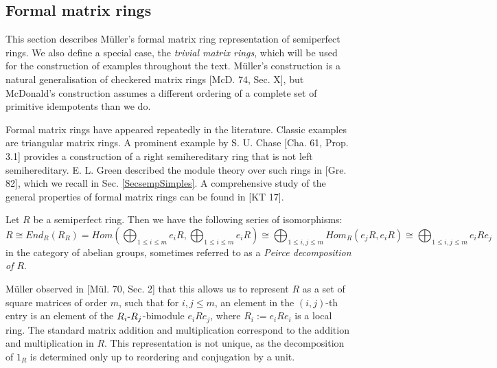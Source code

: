\documentclass[11pt]{article}
\theoremstyle{plain}
\theoremstyle{remark}
\theoremstyle{plain}
\begin{document}
\subsection{Formal matrix rings}\label{Secsempmatrix}


This section describes Müller's formal matrix ring representation of semiperfect rings. We also define a special case, the \textit{trivial matrix rings}, which will be used for the construction of examples throughout the text. Müller's construction is a natural generalisation of checkered matrix rings [McD. 74, Sec. X], but McDonald's construction assumes a different ordering of a complete set of primitive idempotents than we do.

Formal matrix rings have appeared repeatedly in the literature. Classic examples are triangular matrix rings. A prominent example by S. U. Chase [Cha. 61, Prop. 3.1] provides a construction of a right semihereditary ring that is not left semihereditary. E. L. Green described the module theory over such rings in [Gre. 82], which we recall in Sec. \ref{SecsempSimples}.  A comprehensive study of the general properties of formal matrix rings can be found in [KT 17].


\smallskip

Let $R$ be a semiperfect ring. Then we have the following series of isomorphisms:
\[R\cong End_R(R_R)=Hom(\bigoplus_{1 \leq i \leq m } e_iR, \bigoplus_{1 \leq i \leq m } e_iR)\cong \bigoplus_{1\leq i, j \leq m} Hom_R(e_jR, e_iR)\cong  \bigoplus_{1\leq i, j \leq m} e_iRe_j \]
in the category of abelian groups, sometimes referred to as a \textit{Peirce decomposition of $R$}.

Müller observed in [Mül. 70, Sec. 2] that this allows us to represent $R$ as a set of square matrices of order $m$, such that for $i, j\leq m$, an element in the $(i,j)$-th entry is an element of the $R_i\text-R_j$-bimodule $e_iRe_j$, where $R_i:=e_iRe_i$ is a local ring. The standard matrix addition and multiplication correspond to the addition and multiplication in $R$. This representation is not unique, as the decomposition of $1_R$ is determined only up to reordering and conjugation by a unit.
\end{document}
